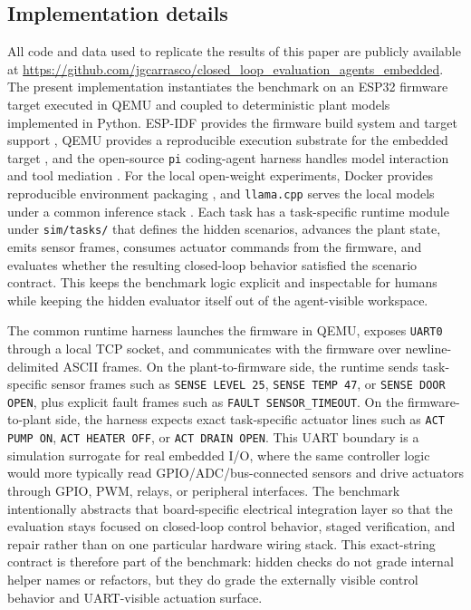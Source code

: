 \documentclass[a4paper,fleqn]{cas-dc}
\DeclareRobustCommand{\tool}[1]{\texttt{\nolinkurl{#1}}}
\begin{document}
\subsection{Implementation details}

All code and data used to replicate the results of this paper are publicly available at \url{https://github.com/jgcarrasco/closed_loop_evaluation_agents_embedded}. The present implementation instantiates the benchmark on an ESP32 firmware target executed in QEMU and coupled to deterministic plant models implemented in Python. ESP-IDF provides the firmware build system and target support \cite{esp_idf}, QEMU provides a reproducible execution substrate for the embedded target \cite{systems_sim_eval}, and the open-source \tool{pi} coding-agent harness handles model interaction and tool mediation \cite{pi_mono_coding_agent}. For the local open-weight experiments, Docker provides reproducible environment packaging \cite{docker}, and \tool{llama.cpp} serves the local models under a common inference stack \cite{llamacpp}. Each task has a task-specific runtime module under \tool{sim/tasks/} that defines the hidden scenarios, advances the plant state, emits sensor frames, consumes actuator commands from the firmware, and evaluates whether the resulting closed-loop behavior satisfied the scenario contract. This keeps the benchmark logic explicit and inspectable for humans while keeping the hidden evaluator itself out of the agent-visible workspace.

The common runtime harness launches the firmware in QEMU, exposes \tool{UART0} through a local TCP socket, and communicates with the firmware over newline-delimited ASCII frames. On the plant-to-firmware side, the runtime sends task-specific sensor frames such as \texttt{SENSE LEVEL 25}, \texttt{SENSE TEMP 47}, or \texttt{SENSE DOOR OPEN}, plus explicit fault frames such as \texttt{FAULT SENSOR\_TIMEOUT}. On the firmware-to-plant side, the harness expects exact task-specific actuator lines such as \texttt{ACT PUMP ON}, \texttt{ACT HEATER OFF}, or \texttt{ACT DRAIN OPEN}. This UART boundary is a simulation surrogate for real embedded I/O, where the same controller logic would more typically read GPIO/ADC/bus-connected sensors and drive actuators through GPIO, PWM, relays, or peripheral interfaces. The benchmark intentionally abstracts that board-specific electrical integration layer so that the evaluation stays focused on closed-loop control behavior, staged verification, and repair rather than on one particular hardware wiring stack. This exact-string contract is therefore part of the benchmark: hidden checks do not grade internal helper names or refactors, but they do grade the externally visible control behavior and UART-visible actuation surface.
\end{document}

